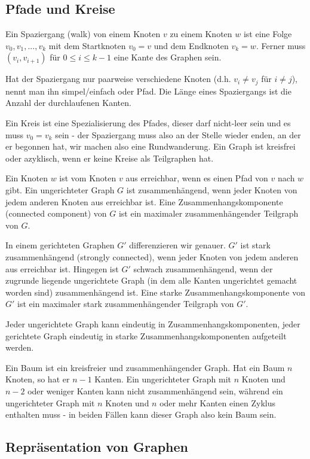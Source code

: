 \documentclass[12pt]{article}
\begin{document}
\subsection{Pfade und Kreise}

Ein Spaziergang (walk) von einem Knoten $v$ zu einem Knoten $w$ ist eine Folge $v_0, v_1, ..., v_k$ mit dem Startknoten $v_0 = v$ und dem Endknoten $v_k = w$. Ferner muss $(v_i, v_{i+1})$ für $0 \leq i \leq k-1$ eine Kante des Graphen sein.

Hat der Spaziergang nur paarweise verschiedene Knoten (d.h. $v_i \neq v_j$ für $i \neq j$), nennt man ihn simpel/einfach oder Pfad. Die Länge eines Spaziergangs ist die Anzahl der durchlaufenen Kanten.

Ein Kreis ist eine Spezialisierung des Pfades, dieser darf nicht-leer sein und es muss $v_0 = v_k$ sein - der Spaziergang muss also an der Stelle wieder enden, an der er begonnen hat, wir machen also eine Rundwanderung. Ein Graph ist kreisfrei oder azyklisch, wenn er keine Kreise als Teilgraphen hat.

Ein Knoten $w$ ist vom Knoten $v$ aus erreichbar, wenn es einen Pfad von $v$ nach $w$ gibt. Ein ungerichteter Graph $G$ ist zusammenhängend, wenn jeder Knoten von jedem anderen Knoten aus erreichbar ist. Eine Zusammenhangskomponente (connected component) von $G$ ist ein maximaler zusammenhängender Teilgraph von $G$.

In einem gerichteten Graphen $G'$ differenzieren wir genauer. $G'$ ist stark zusammenhängend (strongly connected), wenn jeder Knoten von jedem anderen aus erreichbar ist. Hingegen ist $G'$ schwach zusammenhängend, wenn der zugrunde liegende ungerichtete Graph (in dem alle Kanten ungerichtet gemacht worden sind) zusammenhängend ist. Eine starke Zusammenhangskomponente von $G'$ ist ein maximaler stark zusammenhängender Teilgraph von $G'$.

Jeder ungerichtete Graph kann eindeutig in Zusammenhangskomponenten, jeder gerichtete Graph eindeutig in starke Zusammenhangskomponenten aufgeteilt werden.

Ein Baum ist ein kreisfreier und zusammenhängender Graph. Hat ein Baum $n$ Knoten, so hat er $n-1$ Kanten. Ein ungerichteter Graph mit $n$ Knoten und $n-2$ oder weniger Kanten kann nicht zusammenhängend sein, während ein ungerichteter Graph mit $n$ Knoten und $n$ oder mehr Kanten einen Zyklus enthalten muss - in beiden Fällen kann dieser Graph also kein Baum sein.

\subsection{Repräsentation von Graphen}
\end{document}
